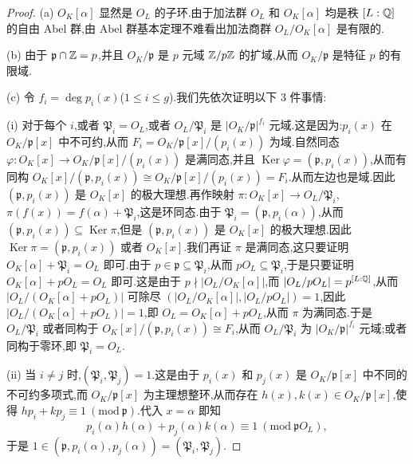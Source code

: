 \begin{proof}
(a) $O_K[\alpha]$ 显然是 $O_L$ 的子环.由于加法群 $O_L$ 和 $O_K[\alpha]$ 均是秩 $[L:\mathbb{Q}]$ 的自由 Abel 群,由 Abel 群基本定理不难看出加法商群 $O_L/O_K[\alpha]$ 是有限的.

(b) 由于 $\mathfrak{p}\cap\mathbb{Z}=p$,并且 $O_K/\mathfrak{p}$ 是 $p$ 元域 $\mathbb{Z}/p\mathbb{Z}$ 的扩域,从而 $O_K/\mathfrak{p}$ 是特征 $p$ 的有限域.

(c) 令 $f_i=\deg p_i(x)$($1\leqslant i\leqslant g$).我们先依次证明以下 $3$ 件事情:

(i) 对于每个 $i$,或者 $\mathfrak{P}_i=O_L$,或者 $O_L/\mathfrak{P}_i$ 是 $|O_K/\mathfrak{p}|^{f_i}$ 元域.这是因为:$p_i(x)$ 在 $O_K/\mathfrak{p}[x]$ 中不可约,从而 $F_i=O_K/\mathfrak{p}[x]/(p_i(x))$ 为域.自然同态 $\varphi\colon O_K[x]\to O_K/\mathfrak{p}[x]/(p_i(x))$ 是满同态,并且 $\operatorname{Ker}\varphi=(\mathfrak{p},p_i(x))$,从而有同构 $O_K[x]/(\mathfrak{p},p_i(x))\cong O_K/\mathfrak{p}[x]/(p_i(x))=F_i$.从而左边也是域.因此 $(\mathfrak{p},p_i(x))$ 是 $O_K[x]$ 的极大理想.再作映射 $\pi\colon O_K[x]\to O_L/\mathfrak{P}_i$,$\pi(f(x))=f(\alpha)+\mathfrak{P}_i$,这是环同态.由于 $\mathfrak{P}_i=(\mathfrak{p},p_i(\alpha))$,从而 $(\mathfrak{p},p_i(x))\subseteq\operatorname{Ker}\pi$,但是 $(\mathfrak{p},p_i(x))$ 是 $O_K[x]$ 的极大理想.因此 $\operatorname{Ker}\pi=(\mathfrak{p},p_i(x))$ 或者 $O_K[x]$.我们再证 $\pi$ 是满同态,这只要证明 $O_K[\alpha]+\mathfrak{P}_i=O_L$ 即可.由于 $p\in\mathfrak{p}\subseteq\mathfrak{P}_i$,从而 $pO_L\subseteq\mathfrak{P}_i$,于是只要证明 $O_K[\alpha]+pO_L=O_L$ 即可.这是由于 $p\nmid|O_L/O_K[\alpha]|$,而 $|O_L/pO_L|=p^{[L:\mathbb{Q}]}$,从而 $|O_L/(O_K[\alpha]+pO_L)|$ 可除尽 $(|O_L/O_K[\alpha]|,|O_L/pO_L|)=1$,因此 $|O_L/(O_K[\alpha]+pO_L)|=1$,即 $O_L=O_K[\alpha]+pO_L$,从而 $\pi$ 为满同态.于是 $O_L/\mathfrak{P}_i$ 或者同构于 $O_K[x]/(\mathfrak{p},p_i(x))\cong F_i$,从而 $O_L/\mathfrak{P}_i$ 为 $|O_K/\mathfrak{p}|^{f_i}$ 元域;或者同构于零环,即 $\mathfrak{P}_i=O_L$.

(ii) 当 $i\neq j$ 时,$(\mathfrak{P}_i,\mathfrak{P}_j)=1$.这是由于 $p_i(x)$ 和 $p_j(x)$ 是 $O_K/\mathfrak{p}[x]$ 中不同的不可约多项式,而 $O_K/\mathfrak{p}[x]$ 为主理想整环,从而存在 $h(x),k(x)\in O_K/\mathfrak{p}[x]$,使得 $hp_i+kp_j\equiv 1\ (\mathrm{mod}\ \mathfrak{p})$.代入 $x=\alpha$ 即知
\[
  p_i(\alpha)h(\alpha)+p_j(\alpha)k(\alpha)\equiv 1\ (\mathrm{mod}\ \mathfrak{p}O_L),
\]
于是 $1\in(\mathfrak{p},p_i(\alpha),p_j(\alpha))=(\mathfrak{P}_i,\mathfrak{P}_j)$.


\end{proof}
